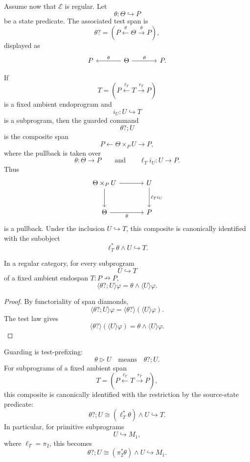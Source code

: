 Assume now that \(\mathcal E\) is regular. Let
\[
\theta:\Theta\hookrightarrow P
\]
be a state predicate. The associated test span is
\[
\theta?
=
\left(
P\xleftarrow{\theta}\Theta\xrightarrow{\theta}P
\right),
\]
displayed as
\[
\begin{tikzcd}[column sep=large]
P
&
\Theta
  \arrow[l, "\theta"']
  \arrow[r, "\theta"]
&
P .
\end{tikzcd}
\]

If
\[
T=
\left(
P\xleftarrow{\ell_T}T\xrightarrow{r_T}P
\right)
\]
is a fixed ambient endoprogram and
\[
i_U:U\hookrightarrow T
\]
is a subprogram, then the guarded command
\[
\theta?;U
\]
is the composite span
\[
P\xleftarrow{} \Theta\times_{P}U\xrightarrow{}P,
\]
where the pullback is taken over
\[
\theta:\Theta\to P
\qquad
\text{and}
\qquad
\ell_T i_U:U\to P.
\]
Thus
\[
\begin{tikzcd}[column sep=large,row sep=large]
\Theta\times_P U
  \arrow[r]
  \arrow[d]
&
U
  \arrow[d, "\ell_T i_U"]
\\
\Theta
  \arrow[r, "\theta"']
&
P
\end{tikzcd}
\]
is a pullback. Under the inclusion \(U\hookrightarrow T\), this composite
is canonically identified with the subobject
\[
\ell_T^\ast\theta\wedge U
\hookrightarrow T.
\]

\begin{proposition}
\label{prop:guard-prefix-law}
In a regular category, for every subprogram
\[
U\hookrightarrow T
\]
of a fixed ambient endospan \(T:P\nrightarrow P\),
\[
\langle \theta?;U\rangle\varphi
=
\theta\wedge \langle U\rangle\varphi.
\]
\end{proposition}

\begin{proof}
By functoriality of span diamonds,
\[
\langle \theta?;U\rangle\varphi
=
\langle \theta?\rangle(\langle U\rangle\varphi).
\]
The test law gives
\[
\langle \theta?\rangle(\langle U\rangle\varphi)
=
\theta\wedge\langle U\rangle\varphi.
\]
\end{proof}

\begin{remark}
\label{rem:guarded-commands-as-test-prefixing}
Guarding is test-prefixing:
\[
\theta\triangleright U
\quad
\text{means}
\quad
\theta?;U.
\]
For subprograms of a fixed ambient span
\[
T=
\left(P\xleftarrow{\ell_T}T\xrightarrow{r_T}P\right),
\]
this composite is canonically identified with the restriction by the
source-state predicate:
\[
\theta?;U
\cong
(\ell_T^\ast\theta)\wedge U
\hookrightarrow T.
\]
In particular, for primitive subprograms
\[
U\hookrightarrow M_1,
\]
where \(\ell_T=\pi_2\), this becomes
\[
\theta?;U
\cong
(\pi_2^\ast\theta)\wedge U
\hookrightarrow M_1.
\]
\end{remark}

